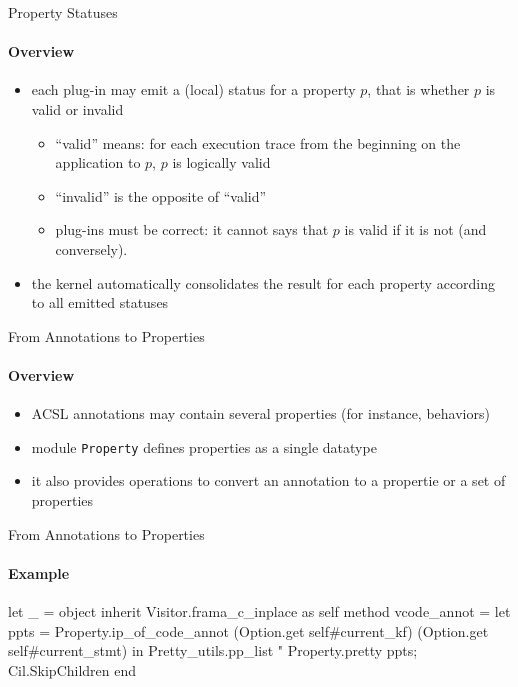 
\begin{frame}{Property Statuses}
\framesubtitle{Overview}

\begin{itemize}
\item each plug-in may emit a (local) status for a property $p$, that is
  whether $p$ is valid or invalid
  \begin{itemize}
  \item ``valid'' means: for each execution trace from the beginning on the
    application to $p$, $p$ is  logically valid
  \item ``invalid'' is the opposite of ``valid''
  \item plug-ins must be correct: it cannot says that $p$ is valid
    if it is not (and conversely).
  \end{itemize}
\item the kernel automatically consolidates the result for each property
  according to all emitted statuses
\end{itemize}

\end{frame}


\begin{frame}{From Annotations to Properties}
  \framesubtitle{Overview}

\begin{itemize}
\item ACSL annotations may contain several properties (for instance, behaviors)
\item module \lstinline+Property+ defines properties as a single datatype
\item it also provides operations to convert an annotation to a propertie or a
  set of properties
\end{itemize}

\end{frame}


\begin{frame}[fragile]{From Annotations to Properties}
  \framesubtitle{Example}

\begin{ocamlcode}
let _ = object
  inherit Visitor.frama_c_inplace as self
  method vcode_annot =
    let ppts = 
      Property.ip_of_code_annot 
        (Option.get self#current_kf)
        (Option.get self#current_stmt)
    in
    Pretty_utils.pp_list "%
      Property.pretty ppts;    
    Cil.SkipChildren	
end
\end{ocamlcode}

\end{frame}


